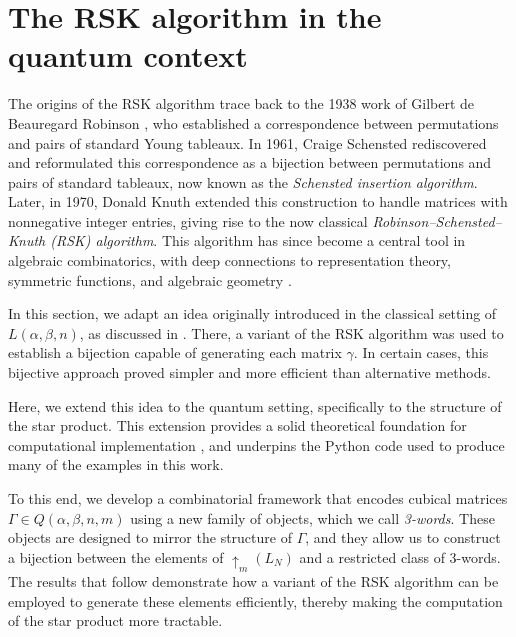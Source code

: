 \documentclass[11pt]{article}
\begin{document}
\section{The RSK algorithm in the quantum context}

The origins of the RSK algorithm trace back to the 1938 work of Gilbert de Beauregard Robinson \cite{Robinson}, who established a correspondence between permutations and pairs of standard Young tableaux. In 1961, Craige Schensted \cite{Schen} rediscovered and reformulated this correspondence as a bijection between permutations and pairs of standard tableaux, now known as the \emph{Schensted insertion algorithm}. Later, in 1970, Donald Knuth \cite{Knuth} extended this construction to handle matrices with nonnegative integer entries, giving rise to the now classical \emph{Robinson--Schensted--Knuth (RSK) algorithm}. This algorithm has since become a central tool in algebraic combinatorics, with deep connections to representation theory, symmetric functions, and algebraic geometry \cite{Sagan,Stanley}.

In this section, we adapt an idea originally introduced in the classical setting of \( L(\alpha, \beta, n) \), as discussed in \cite{PSierra}. There, a variant of the RSK algorithm was used to establish a bijection capable of generating each matrix \(\gamma\). In certain cases, this bijective approach proved simpler and more efficient than alternative methods.

Here, we extend this idea to the quantum setting, specifically to the structure of the star product. This extension provides a solid theoretical foundation for computational implementation \cite{sierra2025}, and underpins the Python code used to produce many of the examples in this work.

To this end, we develop a combinatorial framework that encodes cubical matrices \(\Gamma \in Q(\alpha, \beta, n, m)\) using a new family of objects, which we call \emph{3-words}. These objects are designed to mirror the structure of \(\Gamma\), and they allow us to construct a bijection between the elements of \(\uparrow_m(L_N)\) and a restricted class of 3-words. The results that follow demonstrate how a variant of the RSK algorithm can be employed to generate these elements efficiently, thereby making the computation of the star product more tractable.
\end{document}
